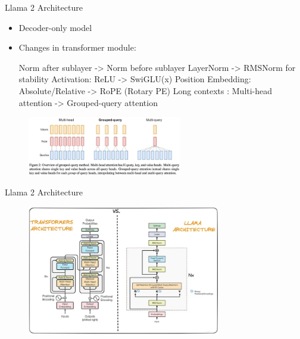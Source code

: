 \documentclass[serif, aspectratio=169]{beamer}
\begin{document}
\begin{frame}{Llama 2 Architecture}
    \begin{itemize}
        \item Decoder-only model
        \item Changes in transformer module:
            \begin{outline}
                \1 Norm after sublayer -> Norm before sublayer
                \1 LayerNorm -> RMSNorm for stability
                \1 Activation: ReLU -> SwiGLU(x)
                \1 Position Embedding: Absolute/Relative -> RoPE (Rotary PE)
                \1 Long contexts : Multi-head attention -> Grouped-query attention
            \end{outline}  
    \end{itemize}
    \hspace{2.5cm}
    \begin{figure}
        \centering
        \includegraphics[width=0.6\textwidth]{pic/llama.png}
        \caption{}
    \end{figure}
\end{frame}

\begin{frame}{Llama 2 Architecture}
    \hspace{1.65cm}
    \begin{figure}
        \centering
        \includegraphics[width=0.75\textwidth]{pic/llamavstras.png}
        \caption{}
    \end{figure}
\end{frame}
\end{document}
